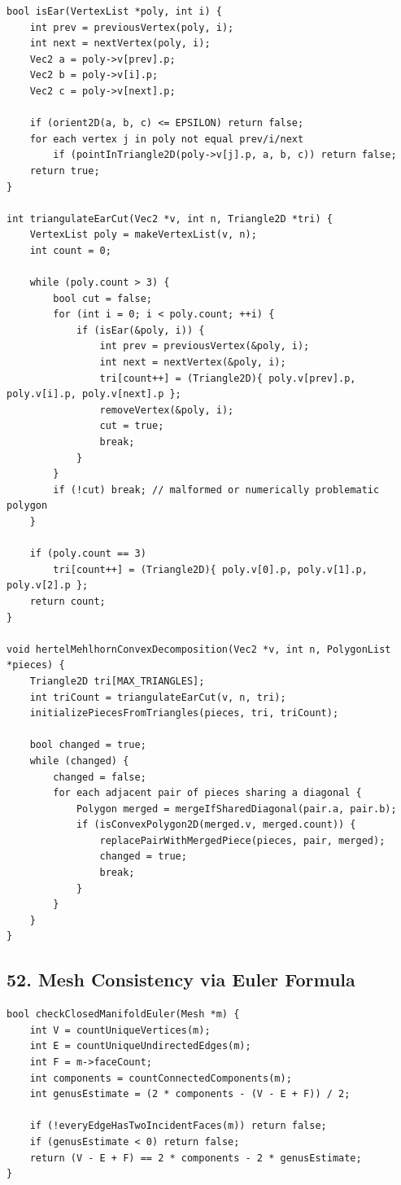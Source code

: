 \documentclass[10pt,letterpaper]{article}
\begin{document}
\begin{verbatim}
bool isEar(VertexList *poly, int i) {
    int prev = previousVertex(poly, i);
    int next = nextVertex(poly, i);
    Vec2 a = poly->v[prev].p;
    Vec2 b = poly->v[i].p;
    Vec2 c = poly->v[next].p;

    if (orient2D(a, b, c) <= EPSILON) return false;
    for each vertex j in poly not equal prev/i/next
        if (pointInTriangle2D(poly->v[j].p, a, b, c)) return false;
    return true;
}

int triangulateEarCut(Vec2 *v, int n, Triangle2D *tri) {
    VertexList poly = makeVertexList(v, n);
    int count = 0;

    while (poly.count > 3) {
        bool cut = false;
        for (int i = 0; i < poly.count; ++i) {
            if (isEar(&poly, i)) {
                int prev = previousVertex(&poly, i);
                int next = nextVertex(&poly, i);
                tri[count++] = (Triangle2D){ poly.v[prev].p, poly.v[i].p, poly.v[next].p };
                removeVertex(&poly, i);
                cut = true;
                break;
            }
        }
        if (!cut) break; // malformed or numerically problematic polygon
    }

    if (poly.count == 3)
        tri[count++] = (Triangle2D){ poly.v[0].p, poly.v[1].p, poly.v[2].p };
    return count;
}

void hertelMehlhornConvexDecomposition(Vec2 *v, int n, PolygonList *pieces) {
    Triangle2D tri[MAX_TRIANGLES];
    int triCount = triangulateEarCut(v, n, tri);
    initializePiecesFromTriangles(pieces, tri, triCount);

    bool changed = true;
    while (changed) {
        changed = false;
        for each adjacent pair of pieces sharing a diagonal {
            Polygon merged = mergeIfSharedDiagonal(pair.a, pair.b);
            if (isConvexPolygon2D(merged.v, merged.count)) {
                replacePairWithMergedPiece(pieces, pair, merged);
                changed = true;
                break;
            }
        }
    }
}
\end{verbatim}


\subsection*{52. Mesh Consistency via Euler Formula}

\begin{verbatim}
bool checkClosedManifoldEuler(Mesh *m) {
    int V = countUniqueVertices(m);
    int E = countUniqueUndirectedEdges(m);
    int F = m->faceCount;
    int components = countConnectedComponents(m);
    int genusEstimate = (2 * components - (V - E + F)) / 2;

    if (!everyEdgeHasTwoIncidentFaces(m)) return false;
    if (genusEstimate < 0) return false;
    return (V - E + F) == 2 * components - 2 * genusEstimate;
}
\end{verbatim}
\end{document}
